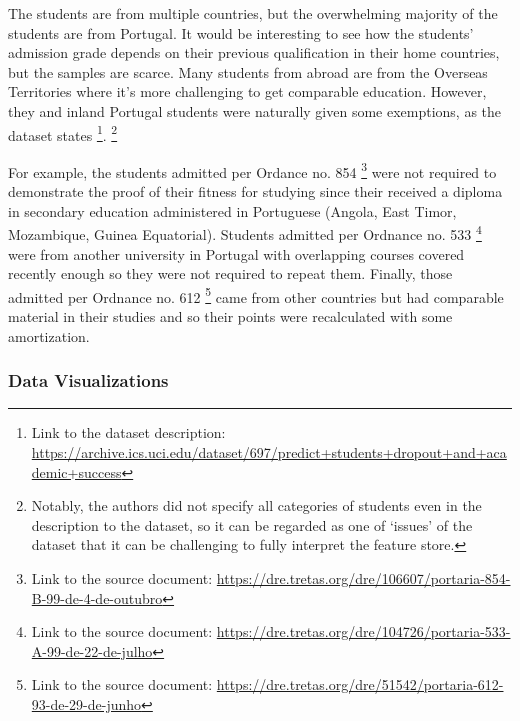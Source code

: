 \documentclass[
  letterpaper,
  DIV=11,
  numbers=noendperiod]{scrartcl}
\begin{document}
The students are from multiple countries, but the overwhelming majority
of the students are from Portugal. It would be interesting to see how
the students' admission grade depends on their previous qualification in
their home countries, but the samples are scarce. Many students from
abroad are from the Overseas Territories where it's more challenging to
get comparable education. However, they and inland Portugal students
were naturally given some exemptions, as the dataset states \footnote{Link
  to the dataset description:
  \url{https://archive.ics.uci.edu/dataset/697/predict+students+dropout+and+academic+success}}.
\footnote{Notably, the authors did not specify all categories of
  students even in the description to the dataset, so it can be regarded
  as one of \enquote*{issues} of the dataset that it can be challenging
  to fully interpret the feature store.}

For example, the students admitted per Ordance no. 854 \footnote{Link to
  the source document:
  \url{https://dre.tretas.org/dre/106607/portaria-854-B-99-de-4-de-outubro}}
were not required to demonstrate the proof of their fitness for studying
since their received a diploma in secondary education administered in
Portuguese (Angola, East Timor, Mozambique, Guinea Equatorial). Students
admitted per Ordnance no. 533 \footnote{Link to the source document:
  \url{https://dre.tretas.org/dre/104726/portaria-533-A-99-de-22-de-julho}}
were from another university in Portugal with overlapping courses
covered recently enough so they were not required to repeat them.
Finally, those admitted per Ordnance no. 612 \footnote{Link to the
  source document:
  \url{https://dre.tretas.org/dre/51542/portaria-612-93-de-29-de-junho}}
came from other countries but had comparable material in their studies
and so their points were recalculated with some amortization.

\hypertarget{data-visualizations}{%
\subsubsection{Data Visualizations}\label{data-visualizations}}
\end{document}

